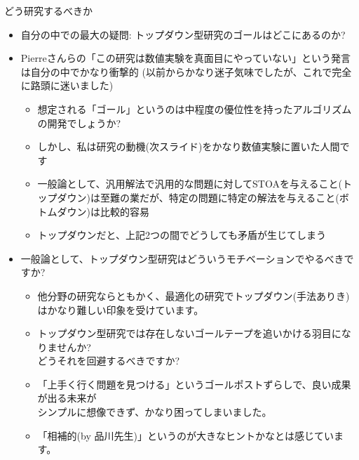 \documentclass[13pt,aspectratio=169,table,dvipdfmx]{beamer}
\begin{document}
    \begin{frame}{どう研究するべきか}
        \begin{itemize}
            \item 自分の中での最大の疑問: トップダウン型研究のゴールはどこにあるのか?
            \item Pierreさんらの「この研究は数値実験を真面目にやっていない」という発言は自分の中でかなり衝撃的 (以前からかなり迷子気味でしたが、これで完全に路頭に迷いました)
                  \begin{itemize}
                      \item 想定される「ゴール」というのは中程度の優位性を持ったアルゴリズムの開発でしょうか?
                      \item しかし、私は研究の動機(次スライド)をかなり数値実験に置いた人間です
                      \item 一般論として、汎用解法で汎用的な問題に対してSTOAを与えること(トップダウン)は至難の業だが、特定の問題に特定の解法を与えること(ボトムダウン)は比較的容易
                      \item トップダウンだと、上記2つの間でどうしても矛盾が生じてしまう
                  \end{itemize}
            \item 一般論として、トップダウン型研究はどういうモチベーションでやるべきですか?
                  \begin{itemize}
                      \item 他分野の研究ならともかく、最適化の研究でトップダウン(手法ありき)はかなり難しい印象を受けています。
                      \item トップダウン型研究では存在しないゴールテープを追いかける羽目になりませんか?\\どうそれを回避するべきですか?
                      \item 「上手く行く問題を見つける」というゴールポストずらしで、良い成果が出る未来が\\シンプルに想像できず、かなり困ってしまいました。
                      \item 「相補的(by 品川先生)」というのが大きなヒントかなとは感じています。
                  \end{itemize}
        \end{itemize}
    \end{frame}
\end{document}
